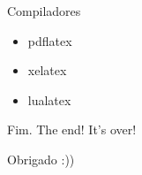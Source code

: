 \documentclass[handout]{beamer}
\begin{document}
\begin{frame}{Compiladores}
    \begin{itemize}
        \item pdflatex
        \item xelatex
        \item lualatex
    \end{itemize}
\end{frame}

\begin{frame}{Fim. The end! It's over!}
    \begin{center}
        \Huge Obrigado :))
    \end{center}
\end{frame}
\end{document}
